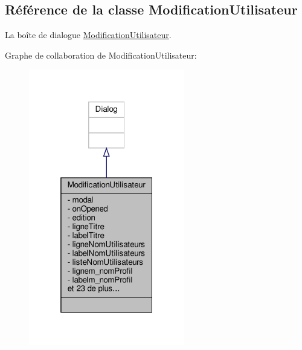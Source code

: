 \hypertarget{class_modification_utilisateur}{}\subsection{Référence de la classe Modification\+Utilisateur}
\label{class_modification_utilisateur}


La boîte de dialogue \hyperlink{class_modification_utilisateur}{Modification\+Utilisateur}.  




Graphe de collaboration de Modification\+Utilisateur\+:\nopagebreak
\begin{figure}[H]
\begin{center}
\leavevmode
\includegraphics[width=193pt]{class_modification_utilisateur__coll__graph}
\end{center}
\end{figure}
